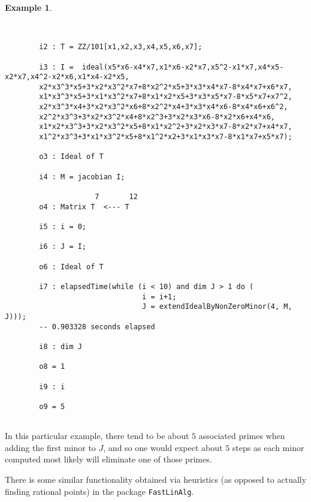 \documentclass[11pt]{amsart}
\theoremstyle{definition}
\newtheorem{example}{Example}[section]
\begin{document}
\begin{example}~~
	
	~~
	{{\small\color{blue}
	\begin{verbatim}
		i2 : T = ZZ/101[x1,x2,x3,x4,x5,x6,x7];
		
		i3 : I =  ideal(x5*x6-x4*x7,x1*x6-x2*x7,x5^2-x1*x7,x4*x5-x2*x7,x4^2-x2*x6,x1*x4-x2*x5,
		x2*x3^3*x5+3*x2*x3^2*x7+8*x2^2*x5+3*x3*x4*x7-8*x4*x7+x6*x7,
		x1*x3^3*x5+3*x1*x3^2*x7+8*x1*x2*x5+3*x3*x5*x7-8*x5*x7+x7^2,
		x2*x3^3*x4+3*x2*x3^2*x6+8*x2^2*x4+3*x3*x4*x6-8*x4*x6+x6^2,
		x2^2*x3^3+3*x2*x3^2*x4+8*x2^3+3*x2*x3*x6-8*x2*x6+x4*x6,
		x1*x2*x3^3+3*x2*x3^2*x5+8*x1*x2^2+3*x2*x3*x7-8*x2*x7+x4*x7,
		x1^2*x3^3+3*x1*x3^2*x5+8*x1^2*x2+3*x1*x3*x7-8*x1*x7+x5*x7);
		
		o3 : Ideal of T
		
		i4 : M = jacobian I;
		
		             7       12
		o4 : Matrix T  <--- T
		
		i5 : i = 0;
		
		i6 : J = I;
		
		o6 : Ideal of T
		
		i7 : elapsedTime(while (i < 10) and dim J > 1 do (
                                i = i+1; 
                                J = extendIdealByNonZeroMinor(4, M, J)));
		-- 0.903328 seconds elapsed
		
		i8 : dim J
		
		o8 = 1
		
		i9 : i
		
		o9 = 5
		
	\end{verbatim}
}}
	
	\end{example} 

In this particular example, there tend to be about $5$ associated primes when adding the first minor to $J$, and so one would expect about $5$ steps as each minor computed most likely will eliminate one of those primes.

There is some similar functionality obtained via heuristics (as opposed to actually finding rational points) in the package {\tt FastLinAlg}.


\vspace{2em}
\end{document}
